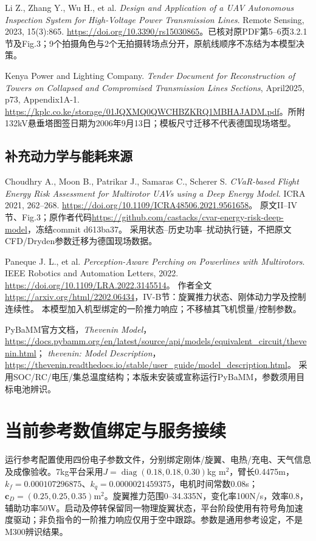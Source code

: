 \noindent [R9] Li Z., Zhang Y., Wu H., et al. \emph{Design and Application of a UAV Autonomous Inspection System for High-Voltage Power Transmission Lines}. Remote Sensing, 2023, 15(3):865. \url{https://doi.org/10.3390/rs15030865}。已核对原PDF第5--6页3.2.1节及Fig.3；9个拍摄角色与2个无拍摄转场点分开，原航线顺序不冻结为本模型决策。

\noindent [R10] Kenya Power and Lighting Company. \emph{Tender Document for Reconstruction of Towers on Collapsed and Compromised Transmission Lines Sections}, April2025, p73, Appendix1A-1. \url{https://kplc.co.ke/storage/01JQXMQ0QWCHBZKRQ1MBHAJADM.pdf}。所附132kV悬垂塔图签日期为2006年9月13日；模板尺寸迁移不代表德国现场塔型。


\clearpage\subsection*{补充动力学与能耗来源}
\noindent [R11] Choudhry A., Moon B., Patrikar J., Samaras C., Scherer S.
\emph{CVaR-based Flight Energy Risk Assessment for Multirotor UAVs using a Deep Energy Model}.
ICRA 2021, 262--268. \url{https://doi.org/10.1109/ICRA48506.2021.9561658}。
原文II--IV节、Fig.3；原作者代码\url{https://github.com/castacks/cvar-energy-risk-deep-model}，冻结commit d613ba37。
采用状态--历史功率--扰动执行链，不把原文CFD/Dryden参数迁移为德国现场数据。

\noindent [R12] Paneque J. L., et al. \emph{Perception-Aware Perching on Powerlines with Multirotors}.
IEEE Robotics and Automation Letters, 2022. \url{https://doi.org/10.1109/LRA.2022.3145514}。
作者全文\url{https://arxiv.org/html/2202.06434}，IV-B节：旋翼推力状态、刚体动力学及控制连续性。
本模型加入机型绑定的一阶推力响应；不移植其飞机惯量/控制参数。

\noindent [R13] PyBaMM官方文档，\emph{Thevenin Model}，
\url{https://docs.pybamm.org/en/latest/source/api/models/equivalent_circuit/thevenin.html}；
\emph{thevenin: Model Description}，\url{https://thevenin.readthedocs.io/stable/user_guide/model_description.html}。
采用SOC/RC/电压/集总温度结构；本版未安装或宣称运行PyBaMM，参数须用目标电池辨识。

\section{当前参考数值绑定与服务接续}
\noindent 运行参考配置使用四份电子参数文件，分别绑定刚体/旋翼、电热/充电、天气信息及成像验收。7kg平台采用$J=\operatorname{diag}(0.18,0.18,0.30)$kg m$^2$，臂长0.4475m，$k_f=0.000107296875$、$k_q=0.0000021459375$，电机时间常数0.08s；$\mathbf c_D=(0.25,0.25,0.35)$m$^2$。旋翼推力范围0--34.335N，变化率100N/s，效率0.8，辅助功率50W。启动及停转保留同一物理旋翼状态，平台阶段使用有符号角加速度驱动；非负指令的一阶推力响应仅用于空中跟踪。参数是通用参考设定，不是M300辨识结果。

